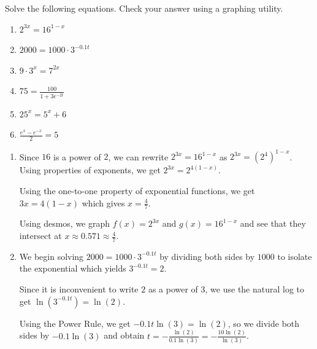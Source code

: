 \documentclass{ximera}
\begin{document}
\begin{example}  \label{expeqnsex1} Solve the following equations.  Check your answer using a graphing utility.
\begin{enumerate}

\item  $2^{3x} = 16^{1-x}$

\item  $2000 = 1000 \cdot 3^{-0.1 t}$ 

\item  $9 \cdot 3^{x} = 7^{2x}$

\item  $75 = \frac{100}{1 + 3e^{-2t}}$

\item  $25^{x} = 5^{x} + 6$

\item  $\frac{e^{x} - e^{-x}}{2} = 5$

\end{enumerate}

\begin{explanation}

\begin{enumerate}

\item  Since $16$ is a power of $2$, we can rewrite  $2^{3x} =  16^{1-x}$ as $2^{3x} = \left(2^4\right)^{1-x}$.  Using properties of exponents, we get $2^{3x} = 2^{4(1-x)}$.  

Using the one-to-one property of exponential functions, we get $3x = 4(1-x)$ which gives $x=\frac{4}{7}$. 

Using desmos, we graph $f(x) = 2^{3x}$ and $g(x) = 16^{1-x}$ and see that they intersect at $x \approx 0.571  \approx \frac{4}{7}$.
\begin{center}
\end{center}


\item  We begin solving $2000 = 1000 \cdot 3^{-0.1 t}$  by dividing both sides by $1000$ to isolate the exponential which yields $3^{-0.1t} = 2$.  

Since it is inconvenient to write $2$ as a power of $3$, we use the natural log to get $\ln\left(3^{-0.1t}\right) = \ln(2)$.  

Using the Power Rule, we get $-0.1 t \ln(3) = \ln(2)$, so we divide both sides by $-0.1 \ln(3)$  and obtain $t = -\frac{\ln(2)}{0.1 \ln(3)} = -\frac{10\ln(2)}{\ln(3)}$.  


\end{enumerate}
\end{explanation}
\end{example}
\end{document}
